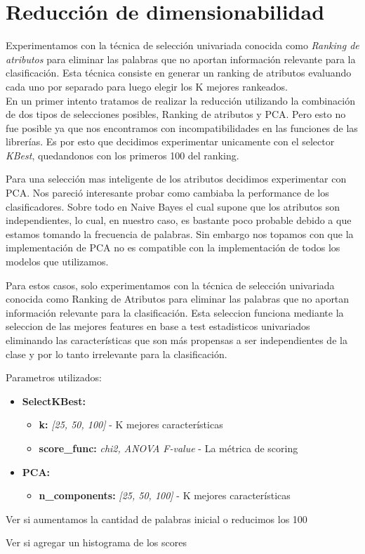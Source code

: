 \section{Reducción de dimensionabilidad}
Experimentamos con la técnica de selección univariada conocida como \textit{Ranking de atributos} para eliminar las palabras que no aportan información relevante
para la clasificación. Esta técnica consiste en generar un ranking de atributos evaluando cada uno por separado para luego elegir los K mejores rankeados. \\
En un primer intento tratamos de realizar la reducción utilizando la combinación de dos tipos de selecciones posibles, Ranking de atributos y PCA.
Pero esto no fue posible ya que nos encontramos con incompatibilidades en las funciones de las librerías.
 Es por esto que decidimos experimentar unicamente con el selector \textit{KBest}, quedandonos con los primeros 100 del ranking.

Para una selección mas inteligente de los atributos decidimos experimentar con PCA. Nos pareció interesante probar como cambiaba la performance de los clasificadores. Sobre todo en Naive Bayes el cual supone que los atributos son independientes, lo cual, en nuestro caso, es bastante poco probable debido a que estamos tomando la frecuencia de palabras. Sin embargo nos topamos con que la implementación de PCA no es compatible con la implementación de todos los modelos que utilizamos. 


Para estos casos, solo experimentamos con la técnica de selección univariada conocida como Ranking de Atributos para eliminar las palabras que no aportan información relevante para la clasificación. Esta seleccion funciona mediante la seleccion de las mejores features en base a test estadisticos univariados eliminando las características que son más propensas a ser independientes de la clase y por lo tanto irrelevante para la clasificación.
  
  
Parametros utilizados:

\begin{itemize}
\item \textbf{SelectKBest:} 
	\begin{itemize}
	\item \textbf{k:} \textit{[25, 50, 100]} - K mejores características
	\item \textbf{score\_func:} \textit{chi2, ANOVA F-value} - La métrica de scoring
	\end{itemize}


\item \textbf{PCA: } 
	\begin{itemize}
	\item \textbf{n\_components:} \textit{[25, 50, 100]} - K mejores características
	\end{itemize}
\end{itemize}



{\Large Ver si aumentamos la cantidad de palabras inicial o reducimos los 100}

{\Large Ver si agregar un histograma de los scores}
